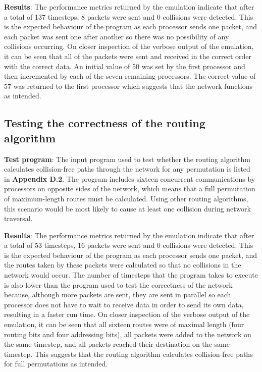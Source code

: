 \documentclass[a4paper, 12pt]{article}
\begin{document}
\noindent\textbf{Results}: The performance metrics returned by the emulation indicate that after a total of 137 timesteps, 8 packets were sent and 0 collisions were detected. This is the expected behaviour of the program as each processor sends one packet, and each packet was sent one after another so there was no possibility of any collisions occurring. On closer inspection of the verbose output of the emulation, it can be seen that all of the packets were sent and received in the correct order with the correct data. An initial value of 50 was set by the first processor and then incremented by each of the seven remaining processors. The correct value of 57 was returned to the first processor which suggests that the network functions as intended. 

\subsection{Testing the correctness of the routing algorithm}

\textbf{Test program}: The input program used to test whether the routing algorithm calculates collision-free paths through the network for any permutation is listed in \textbf{Appendix D.2}. The program includes sixteen concurrent communications by processors on opposite sides of the network, which means that a full permutation of maximum-length routes must be calculated. Using other routing algorithms, this scenario would be most likely to cause at least one collision during network traversal.

\noindent\textbf{Results}: The performance metrics returned by the emulation indicate that after a total of 53 timesteps, 16 packets were sent and 0 collisions were detected. This is the expected behaviour of the program as each processor sends one packet, and the routes taken by these packets were calculated so that no collisions in the network would occur. The number of timesteps that the program takes to execute is also lower than the program used to test the correctness of the network because, although more packets are sent, they are sent in parallel so each processor does not have to wait to receive data in order to send its own data, resulting in a faster run time. On closer inspection of the verbose output of the emulation, it can be seen that all sixteen routes were of maximal length (four routing bits and four addressing bits), all packets were added to the network on the same timestep, and all packets reached their destination on the same timestep. This suggests that the routing algorithm calculates collision-free paths for full permutations as intended.
\end{document}
